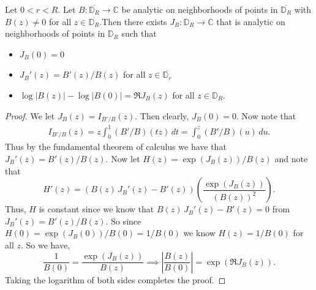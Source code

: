 \begin{theorem}[LogOfAnalyticFunction]
\label{LogOfAnalyticFunction}
\leanok
Let $0<r<R$. Let $B:\overline{\mathbb{D}_{R}}\to\mathbb{C}$ be analytic on neighborhoods of
    points in $\overline{\mathbb{D}_{R}}$ with $B(z)\neq 0$ for all
    $z\in\overline{\mathbb{D}_{R}}$.Then there exists $J_B:\mathbb{D}_R\to\mathbb{C}$ that is
    analytic on neighborhoods of points in $\mathbb{D}_R$ such that
    \begin{itemize}
        \item $J_B(0)=0$
        \item $J_B'(z)=B'(z)/B(z)$ for all $z\in\overline{\mathbb{D}_r}$
        \item $\log|B(z)|-\log|B(0)|=\mathfrak{R}J_B(z)$ for all $z\in\mathbb{D}_R$.
    \end{itemize}
\end{theorem}
\begin{proof}
\leanok
We let $J_B(z)=I_{B'/B}(z)$. Then clearly, $J_B(0)=0$. Now note that
    \begin{align*}
        I_{B'/B}(z)=z\int_0^1(B'/B)(tz)\,dt=\int_0^z(B'/B)(u)\,du.
    \end{align*}
    Thus by the fundamental theorem of calculus we have that $J_B'(z)=B'(z)/B(z)$. Now let
    $H(z)=\exp(J_B(z))/B(z)$ and note that
    $$H'(z)=(B(z)\,J_B'(z)-B'(z))\left(\frac{\exp(J_B(z))}{(B(z))^2}\right).$$
    Thus, $H$ is constant since we know that $B(z)\,J_B'(z)-B'(z)=0$ from $J_B'(z)=B'(z)/B(z)$. So
    since $H(0)=\exp(J_B(0))/B(0)=1/B(0)$ we know $H(z)=1/B(0)$ for all $z$. So we have,
    $$\frac{1}{B(0)}=\frac{\exp(J_B(z))}{B(z)}\implies\left|\frac{B(z)}{B(0)}\right|
      =\exp(\mathfrak{R}J_B(z)).$$
    Taking the logarithm of both sides completes the proof.
\end{proof}
